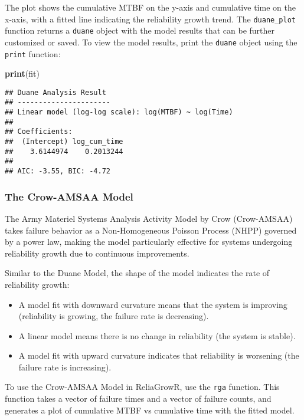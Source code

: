 \documentclass[
]{article}
\newenvironment{Shaded}{\begin{snugshade}}{\end{snugshade}}
\newcommand{\FunctionTok}[1]{\textcolor[rgb]{0.13,0.29,0.53}{\textbf{#1}}}
\newcommand{\NormalTok}[1]{#1}
\providecommand{\tightlist}{%
  \setlength{\itemsep}{0pt}\setlength{\parskip}{0pt}}
\begin{document}
The plot shows the cumulative MTBF on the y-axis and cumulative time on
the x-axis, with a fitted line indicating the reliability growth trend.
The \texttt{duane\_plot} function returns a \texttt{duane} object with
the model results that can be further customized or saved. To view the
model results, print the \texttt{duane} object using the \texttt{print}
function:

\begin{Shaded}
\begin{Highlighting}[]
\FunctionTok{print}\NormalTok{(fit)}
\end{Highlighting}
\end{Shaded}

\begin{verbatim}
## Duane Analysis Result
## ----------------------
## Linear model (log-log scale): log(MTBF) ~ log(Time)
## 
## Coefficients:
##  (Intercept) log_cum_time 
##    3.6144974    0.2013244 
## 
## AIC: -3.55, BIC: -4.72
\end{verbatim}

\subsubsection{The Crow-AMSAA Model}\label{the-crow-amsaa-model}

The Army Materiel Systems Analysis Activity Model by Crow (Crow-AMSAA)
takes failure behavior as a Non-Homogeneous Poisson Process (NHPP)
governed by a power law, making the model particularly effective for
systems undergoing reliability growth due to continuous improvements.

Similar to the Duane Model, the shape of the model indicates the rate of
reliability growth:

\begin{itemize}
\tightlist
\item
  A model fit with downward curvature means that the system is improving
  (reliability is growing, the failure rate is decreasing).
\item
  A linear model means there is no change in reliability (the system is
  stable).
\item
  A model fit with upward curvature indicates that reliability is
  worsening (the failure rate is increasing).
\end{itemize}

To use the Crow-AMSAA Model in ReliaGrowR, use the \texttt{rga}
function. This function takes a vector of failure times and a vector of
failure counts, and generates a plot of cumulative MTBF vs cumulative
time with the fitted model.
\end{document}
